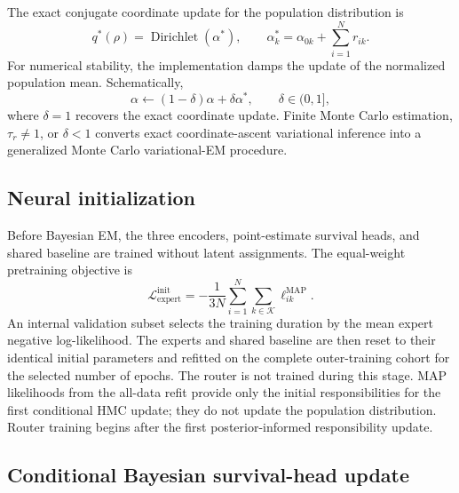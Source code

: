 The exact conjugate coordinate update for the population distribution is
\begin{equation}
 q^*(\rho)=\operatorname{Dirichlet}(\alpha^*),\qquad
 \alpha_k^*=\alpha_{0k}+\sum_{i=1}^{N}r_{ik}.
\label{eq:exact-dirichlet-update}
\end{equation}
For numerical stability, the implementation damps the update of the normalized
population mean. Schematically,
\begin{equation}
 \alpha\leftarrow(1-\delta)\alpha+\delta\alpha^*,
 \qquad\delta\in(0,1],
\label{eq:damped-dirichlet}
\end{equation}
where $\delta=1$ recovers the exact coordinate update. Finite Monte Carlo
estimation, $\tau_r\neq1$, or $\delta<1$ converts exact coordinate-ascent
variational inference into a generalized Monte Carlo variational-EM procedure.

\subsection{Neural initialization}

Before Bayesian EM, the three encoders, point-estimate survival heads, and
shared baseline are trained without latent assignments. The equal-weight
pretraining objective is
\begin{equation}
    \mathcal L_{\mathrm{expert}}^{\mathrm{init}}
    =-\frac{1}{3N}\sum_{i=1}^{N}\sum_{k\in\mathcal K}
      \ell_{ik}^{\mathrm{MAP}}.
\label{eq:initial-expert-loss}
\end{equation}
An internal validation subset selects the training duration by the mean expert
negative log-likelihood. The experts and shared baseline are then reset to
their identical initial parameters and refitted on the complete outer-training
cohort for the selected number of epochs. The router is not trained during
this stage. MAP likelihoods from the all-data refit provide only the initial
responsibilities for the first conditional HMC update; they do not update the
population distribution. Router training begins after the first
posterior-informed responsibility update.

\subsection{Conditional Bayesian survival-head update}

